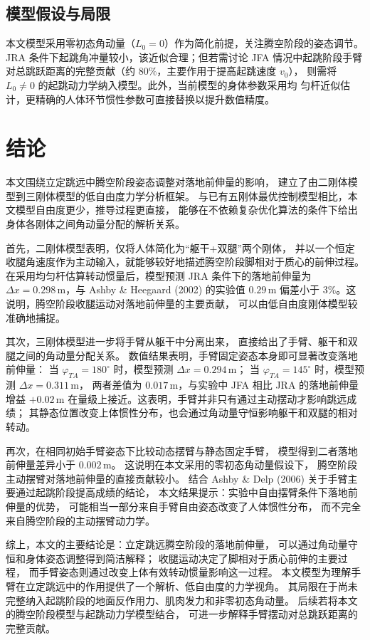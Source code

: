 \documentclass{article}
\begin{document}
\subsection{模型假设与局限}

本文模型采用零初态角动量（$L_0=0$）作为简化前提，关注腾空阶段的姿态调节。
JRA 条件下起跳角冲量较小，该近似合理；但若需讨论 JFA 情况中起跳阶段手臂
对总跳跃距离的完整贡献（约 $80\%$，主要作用于提高起跳速度 $v_0$），
则需将 $L_0\neq 0$ 的起跳动力学纳入模型。此外，当前模型的身体参数采用均
匀杆近似估计，更精确的人体环节惯性参数可直接替换以提升数值精度。

\section{结论}

本文围绕立定跳远中腾空阶段姿态调整对落地前伸量的影响，
建立了由二刚体模型到三刚体模型的低自由度力学分析框架。
与已有五刚体最优控制模型相比，本文模型自由度更少，推导过程更直接，
能够在不依赖复杂优化算法的条件下给出身体各刚体之间角动量分配的解析关系。

首先，二刚体模型表明，仅将人体简化为“躯干+双腿”两个刚体，
并以一个恒定收腿角速度作为主动输入，就能够较好地描述腾空阶段脚相对于质心的前伸过程。
在采用均匀杆估算转动惯量后，模型预测 JRA 条件下的落地前伸量为
$\Delta x=0.298$\,m，与 Ashby \& Heegaard (2002) 的实验值
$0.29$\,m 偏差小于 $3\%$。这说明，腾空阶段收腿运动对落地前伸量的主要贡献，
可以由低自由度刚体模型较准确地捕捉。

其次，三刚体模型进一步将手臂从躯干中分离出来，
直接给出了手臂、躯干和双腿之间的角动量分配关系。
数值结果表明，手臂固定姿态本身即可显著改变落地前伸量：
当 $\varphi_{TA}=180^\circ$ 时，模型预测 $\Delta x=0.294$\,m；
当 $\varphi_{TA}=145^\circ$ 时，模型预测 $\Delta x=0.311$\,m，
两者差值为 $0.017$\,m，与实验中 JFA 相比 JRA 的落地前伸量增益
$+0.02$\,m 在量级上接近。这表明，手臂并非只有通过主动摆动才影响跳远成绩；
其静态位置改变上体惯性分布，也会通过角动量守恒影响躯干和双腿的相对转动。

再次，在相同初始手臂姿态下比较动态摆臂与静态固定手臂，
模型得到二者落地前伸量差异小于 $0.002$\,m。
这说明在本文采用的零初态角动量假设下，
腾空阶段主动摆臂对落地前伸量的直接贡献较小。
结合 Ashby \& Delp (2006) 关于手臂主要通过起跳阶段提高成绩的结论，
本文结果提示：实验中自由摆臂条件下落地前伸量的优势，
可能相当一部分来自手臂自由姿态改变了人体惯性分布，
而不完全来自腾空阶段的主动摆臂动力学。

综上，本文的主要结论是：立定跳远腾空阶段的落地前伸量，
可以通过角动量守恒和身体姿态调整得到简洁解释；
收腿运动决定了脚相对于质心前伸的主要过程，
而手臂姿态则通过改变上体有效转动惯量影响这一过程。
本文模型为理解手臂在立定跳远中的作用提供了一个解析、低自由度的力学视角。
其局限在于尚未完整纳入起跳阶段的地面反作用力、肌肉发力和非零初态角动量。
后续若将本文的腾空阶段模型与起跳动力学模型结合，
可进一步解释手臂摆动对总跳跃距离的完整贡献。
\end{document}
